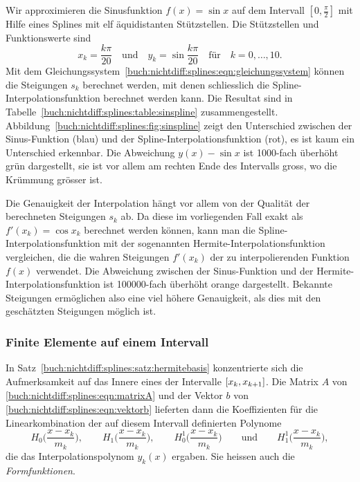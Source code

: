 \begin{beispiel}
\label{buch:nichtdiff:splines:bsp:sinspline}


Wir approximieren die Sinusfunktion $f(x)=\sin x$
auf dem Intervall $[0,\frac{\pi}2]$ mit Hilfe eines Splines
mit elf äquidistanten Stützstellen.
Die Stützstellen und Funktionswerte sind
\[
x_k = \frac{k\pi}{20}
\quad\text{und}\quad
y_k = \sin\frac{k\pi}{20}
\quad\text{für}\quad
k=0,\dots,10.
\]
Mit dem Gleichungssystem~\eqref{buch:nichtdiff:splines:eqn:gleichungssystem}
können die Steigungen $s_k$ berechnet werden, mit denen schliesslich die
Spline-Interpolationsfunktion berechnet werden kann.
Die Resultat sind in Tabelle~\ref{buch:nichtdiff:splines:table:sinspline}
zusammengestellt.
Abbildung~\ref{buch:nichtdiff:splines:fig:sinspline} zeigt den Unterschied
zwischen der Sinus-Funktion (blau) und der Spline-Interpolationsfunktion (rot),
es ist kaum ein Unterschied erkennbar.
Die Abweichung $y(x)-\sin x$ ist 1000-fach überhöht grün dargestellt, sie
ist vor allem am rechten Ende des Intervalls gross, wo die Krümmung grösser
ist.

Die Genauigkeit der Interpolation hängt vor allem von der Qualität der 
berechneten Steigungen $s_k$ ab.
Da diese im vorliegenden Fall exakt als $f'(x_k) = \cos x_k$ berechnet
werden können, kann man die Spline-Interpolationsfunktion mit der sogenannten
Hermite-Interpolationsfunktion vergleichen, die die wahren Steigungen
$f'(x_k)$ der zu interpolierenden Funktion $f(x)$ verwendet.
Die Abweichung zwischen der Sinus-Funktion und der
Hermite-Interpolationsfunktion ist 100000-fach überhöht orange dargestellt.
Bekannte Steigungen ermöglichen also eine viel höhere Genauigkeit, als dies
mit den geschätzten Steigungen möglich ist.
\end{beispiel}

%
%
\subsubsection{Finite Elemente auf einem Intervall}
In Satz~\ref{buch:nichtdiff:splines:satz:hermitebasis} konzentrierte sich
die Aufmerksamkeit auf das Innere eines der Intervalle
$[x_{k\mathstrut},x_{k+1\mathstrut}]$.
Die Matrix $A$ von
\eqref{buch:nichtdiff:splines:eqn:matrixA}
und der Vektor $b$ von
\eqref{buch:nichtdiff:splines:eqn:vektorb}
lieferten dann die Koeffizienten für die Linearkombination der
auf diesem Intervall definierten Polynome
\[
H_0\biggl(\frac{x-x_k}{m_k}\biggr),
\qquad
H_1\biggl(\frac{x-x_k}{m_k}\biggr),
\qquad
H_0^1\biggl(\frac{x-x_k}{m_k}\biggr)
\qquad\text{und}\qquad
H_1^1\biggl(\frac{x-x_k}{m_k}\biggr),
\]
die das Interpolationspolynom $y_k(x)$ ergaben.
Sie heissen auch die {\em Formfunktionen}.
%

